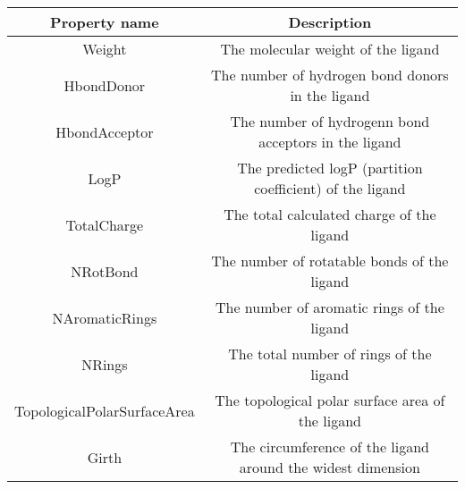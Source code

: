 \begin{tabular}{|c|c|}
\hline
Property name & Description \\
\hline
Weight & The molecular weight of the ligand\\
\hline
HbondDonor & The number of hydrogen bond donors in the ligand\\
\hline
HbondAcceptor & The number of hydrogenn bond acceptors in the ligand\\
\hline
LogP & The predicted logP (partition coefficient) of the ligand\\
\hline
TotalCharge & The total calculated charge of the ligand\\
\hline
NRotBond & The number of rotatable bonds of the ligand\\
\hline
NAromaticRings & The number of aromatic rings of the ligand\\
\hline
NRings & The total number of rings of the ligand\\
\hline
TopologicalPolarSurfaceArea & The topological polar surface area of the ligand\\
\hline
Girth & The circumference of the ligand around the widest dimension\\
\hline
\end{tabular}